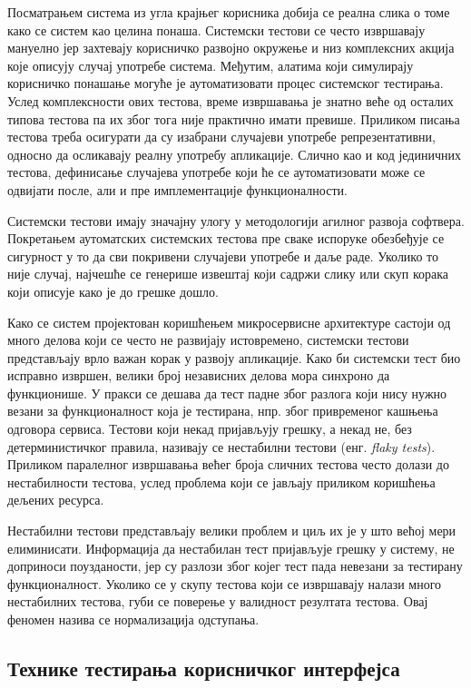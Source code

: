 \documentclass[12pt,oneside]{memoir}
\begin{document}
Посматрањем система из угла крајњег корисника добија се реална слика о томе како се систем као целина понаша. Системски тестови се често извршавају мануелно јер захтевају корисничко развојно окружење и низ комплексних акција које описују случај употребе система. Међутим, алатима који симулирају корисничко понашање могуће је аутоматизовати процес системског тестирања. Услед комплексности ових тестова, време извршавања је знатно веће од осталих типова тестова па их због тога није практично имати превише. Приликом писања тестова треба осигурати да су изабрани случајеви употребе репрезентативни, односно да осликавају реалну употребу апликације. Слично као и код јединичних тестова, дефинисање случајева употребе који ће се аутоматизовати може се одвијати после, али и пре имплементације функционалности.

Системски тестови имају значајну улогу у методологији агилног развоја софтвера. Покретањем аутоматских системских тестова пре сваке испоруке обезбеђује се сигурност у то да сви покривени случајеви употребе и даље раде. Уколико то није случај, најчешће се генерише извештај који садржи слику или скуп корака који описује како је до грешке дошло.

Како се систем пројектован коришћењем микросервисне архитектуре састоји од много делова који се често не развијају истовремено, системски тестови представљају врло важан корак у развоју апликације. Како би системски тест био исправно извршен, велики број независних делова мора синхроно да функционише. У пракси се дешава да тест падне због разлога који нису нужно везани за функционалност која је тестирана, нпр. због привременог кашњења одговора сервиса.  Тестови који некад пријављују грешку, а некад не, без детерминистичког правила, називају се нестабилни тестови (енг. \textit{flaky tests}). Приликом паралелног извршавања већег броја сличних тестова често долази до нестабилности тестова, услед проблема који се јављају приликом коришћења дељених ресурса.

Нестабилни тестови представљају велики проблем и циљ их је у што већој мери елиминисати. Информација да нестабилан тест пријављује грешку у систему, не доприноси поузданости, јер су разлози због којег тест пада невезани за тестирану функционалност. Уколико се у скупу тестова који се извршавају налази много нестабилних тестова, губи се поверење у валидност резултата тестова. Овај феномен назива се нормализација одступања.



\subsection{Технике тестирања корисничког интерфејса}
\end{document}
